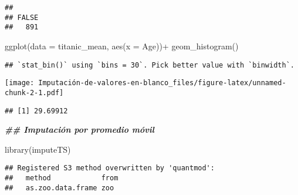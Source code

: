 \documentclass[
]{article}
\newenvironment{Shaded}{\begin{snugshade}}{\end{snugshade}}
\newcommand{\AttributeTok}[1]{\textcolor[rgb]{0.77,0.63,0.00}{#1}}
\newcommand{\DocumentationTok}[1]{\textcolor[rgb]{0.56,0.35,0.01}{\textbf{\textit{#1}}}}
\newcommand{\FunctionTok}[1]{\textcolor[rgb]{0.00,0.00,0.00}{#1}}
\newcommand{\NormalTok}[1]{#1}
\newcommand{\OtherTok}[1]{\textcolor[rgb]{0.56,0.35,0.01}{#1}}
\newcommand{\SpecialCharTok}[1]{\textcolor[rgb]{0.00,0.00,0.00}{#1}}
\begin{document}
\begin{verbatim}
## 
## FALSE 
##   891
\end{verbatim}

\begin{Shaded}
\begin{Highlighting}[]
\FunctionTok{ggplot}\NormalTok{(}\AttributeTok{data =}\NormalTok{ titanic\_mean, }\FunctionTok{aes}\NormalTok{(}\AttributeTok{x =}\NormalTok{ Age))}\SpecialCharTok{+} \FunctionTok{geom\_histogram}\NormalTok{()}
\end{Highlighting}
\end{Shaded}

\begin{verbatim}
## `stat_bin()` using `bins = 30`. Pick better value with `binwidth`.
\end{verbatim}

\texttt{[image: Imputación-de-valores-en-blanco\_files/figure-latex/unnamed-chunk-2-1.pdf]}

\begin{Shaded}
\end{Shaded}

\begin{verbatim}
## [1] 29.69912
\end{verbatim}

\begin{Shaded}
\begin{Highlighting}[]
\DocumentationTok{\#\# Imputación por promedio móvil}

\FunctionTok{library}\NormalTok{(imputeTS)}
\end{Highlighting}
\end{Shaded}

\begin{verbatim}
## Registered S3 method overwritten by 'quantmod':
##   method            from
##   as.zoo.data.frame zoo
\end{verbatim}

\begin{Shaded}
\end{Shaded}
\end{document}
